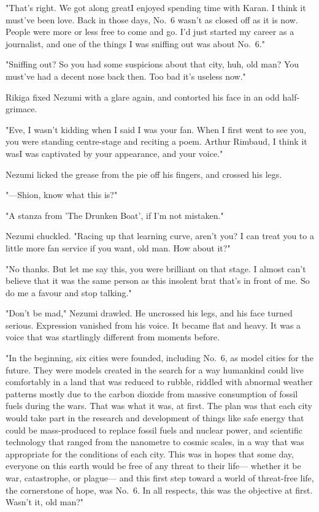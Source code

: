 "That's right. We got along great\el I enjoyed spending time with Karan.
I think it must've been love. Back in those days, No.~6 wasn't as closed
off as it is now. People were more or less free to come and go. I'd just
started my career as a journalist, and one of the things I was sniffing
out was about No.~6."

"Sniffing out? So you had some suspicions about that city, huh, old man?
You must've had a decent nose back then. Too bad it's useless now."

Rikiga fixed Nezumi with a glare again, and contorted his face in an odd
half-grimace.

"Eve, I wasn't kidding when I said I was your fan. When I first went to
see you, you were standing centre-stage and reciting a poem. Arthur
Rimbaud, I think it was\el I was captivated by your appearance, and your
voice."

Nezumi licked the grease from the pie off his fingers, and crossed his
legs.


"---Shion, know what this is?"

"A stanza from 'The Drunken Boat', if I'm not mistaken."

Nezumi chuckled. "Racing up that learning curve, aren't you? I can treat
you to a little more fan service if you want, old man. How about it?"

"No thanks. But let me say this, you were brilliant on that stage. I
almost can't believe that it was the same person as this insolent brat
that's in front of me. So do me a favour and stop talking."

"Don't be mad," Nezumi drawled. He uncrossed his legs, and his face
turned serious. Expression vanished from his voice. It became flat and
heavy. It was a voice that was startlingly different from moments
before.

"In the beginning, six cities were founded, including No.~6, as model
cities for the future. They were models created in the search for a way
humankind could live comfortably in a land that was reduced to rubble,
riddled with abnormal weather patterns mostly due to the carbon dioxide
from massive consumption of fossil fuels during the wars. That was what
it was, at first. The plan was that each city would take part in the
research and development of things like safe energy that could be
mass-produced to replace fossil fuels and nuclear power, and scientific
technology that ranged from the nanometre to cosmic scales, in a way
that was appropriate for the conditions of each city. This was in hopes
that some day, everyone on this earth would be free of any threat to
their life--- whether it be war, catastrophe, or plague--- and this first
step toward a world of threat-free life, the cornerstone of hope, was
No.~6. In all respects, this was the objective at first. Wasn't it, old
man?"

